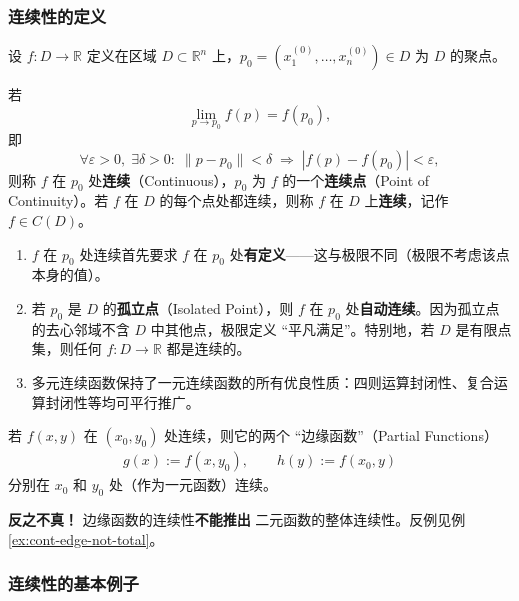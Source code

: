 \documentclass[lang=cn,11pt]{elegantbook}
\begin{document}
\subsubsection{连续性的定义}

\begin{definition}[$n$ 元函数的连续性] \label{def:multivar-cont}
设 $f:D\to\mathbb{R}$ 定义在区域 $D\subset\mathbb{R}^n$ 上，$p_0=(x_1^{(0)},\dots,x_n^{(0)})\in D$ 为 $D$ 的聚点。

若
\[
\lim_{p\to p_0}f(p)=f(p_0),
\]
即
\[
\forall\varepsilon>0,\;\exists\delta>0:\;
\|p-p_0\|<\delta\;\Longrightarrow\;|f(p)-f(p_0)|<\varepsilon,
\]
则称 $f$ 在 $p_0$ 处\textbf{连续}（Continuous），$p_0$ 为 $f$ 的一个\textbf{连续点}（Point of Continuity）。若 $f$ 在 $D$ 的每个点处都连续，则称 $f$ 在 $D$ 上\textbf{连续}，记作 $f\in C(D)$。
\end{definition}

\begin{note}[连续性的三个要点]
\begin{enumerate}
  \item[(1)] $f$ 在 $p_0$ 处连续首先要求 $f$ 在 $p_0$ 处\textbf{有定义}——这与极限不同（极限不考虑该点本身的值）。
  \item[(2)] 若 $p_0$ 是 $D$ 的\textbf{孤立点}（Isolated Point），则 $f$ 在 $p_0$ 处\textbf{自动连续}。因为孤立点的去心邻域不含 $D$ 中其他点，极限定义 ``平凡满足''。特别地，若 $D$ 是有限点集，则任何 $f:D\to\mathbb{R}$ 都是连续的。
  \item[(3)] 多元连续函数保持了一元连续函数的所有优良性质：四则运算封闭性、复合运算封闭性等均可平行推广。
\end{enumerate}
\end{note}

\begin{property}[边缘连续性与整体连续性]
若 $f(x,y)$ 在 $(x_0,y_0)$ 处连续，则它的两个 ``边缘函数''（Partial Functions）
\begin{gather*}
g(x):=f(x,y_0),\qquad h(y):=f(x_0,y)
\end{gather*}
分别在 $x_0$ 和 $y_0$ 处（作为一元函数）连续。

\textbf{反之不真！} 边缘函数的连续性\textbf{不能推出} 二元函数的整体连续性。反例见例 \ref{ex:cont-edge-not-total}。
\end{property}


\subsubsection{连续性的基本例子}
\end{document}
